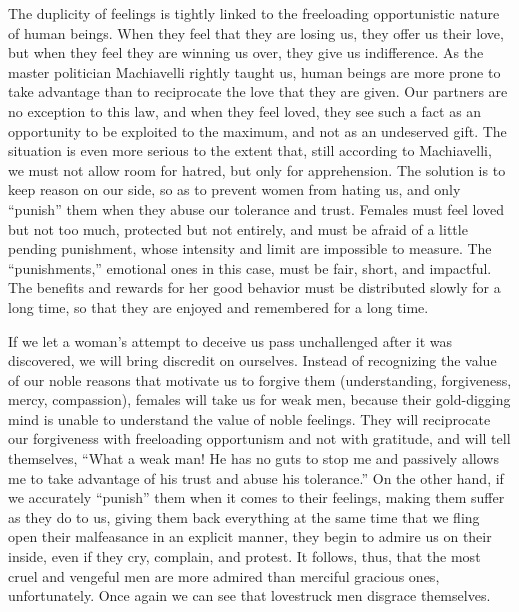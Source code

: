 \par The duplicity of feelings is tightly linked to the freeloading opportunistic nature of human beings. When they feel that they are losing us, they offer us their love, but when they feel they are winning us over, they give us indifference. As the master politician Machiavelli rightly taught us, human beings are more prone to take advantage than to reciprocate the love that they are given. Our partners are no exception to this law, and when they feel loved, they see such a fact as an opportunity to be exploited to the maximum, and not as an undeserved gift. The situation is even more serious to the extent that, still according to Machiavelli, we must not allow room for hatred, but only for apprehension. The solution is to keep reason on our side, so as to prevent women from hating us, and only \enquote{punish} them when they abuse our tolerance and trust. Females must feel loved but not too much, protected but not entirely, and must be afraid of a little pending punishment, whose intensity and limit are impossible to measure. The \enquote{punishments,} emotional ones in this case, must be fair, short, and impactful. The benefits and rewards for her good behavior must be distributed slowly for a long time, so that they are enjoyed and remembered for a long time.

\par If we let a woman's attempt to deceive us pass unchallenged after it was discovered, we will bring discredit on ourselves. Instead of recognizing the value of our noble reasons that motivate us to forgive them (understanding, forgiveness, mercy, compassion), females will take us for weak men, because their gold-digging mind is unable to understand the value of noble feelings. They will reciprocate our forgiveness with freeloading opportunism and not with gratitude, and will tell themselves, \enquote{What a weak man! He has no guts to stop me and passively allows me to take advantage of his trust and abuse his tolerance.} On the other hand, if we accurately \enquote{punish} them when it comes to their feelings, making them suffer as they do to us, giving them back everything at the same time that we fling open their malfeasance in an explicit manner, they begin to admire us on their inside, even if they cry, complain, and protest. It follows, thus, that the most cruel and vengeful men are more admired than merciful gracious ones, unfortunately. Once again we can see that lovestruck men disgrace themselves.

